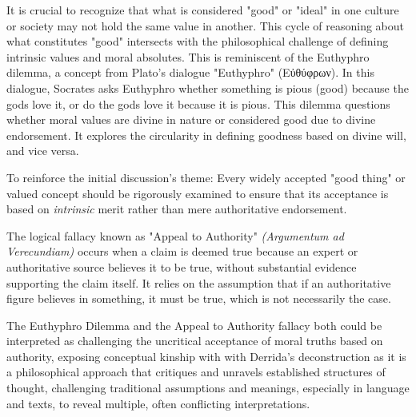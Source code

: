 \documentclass[11pt,a4]{article}
\newcommand{\textgreek}[1]{\begingroup\fontencoding{LGR}\selectfont#1\endgroup}
\begin{document}
    It is crucial to recognize that what is considered
    "good" or "ideal" in one culture or society may not
    hold the same value in another.
    This cycle of reasoning about what constitutes "good"
    intersects with the philosophical challenge of defining
    intrinsic values and moral absolutes. This is reminiscent
    of the Euthyphro dilemma, a concept from Plato's
    dialogue "Euthyphro" \textgreek{(Εὐθύφρων)}. In this
    dialogue, Socrates asks Euthyphro whether something is
    pious (good) because the gods love it, or do the
    gods love it because it is pious. This dilemma
    questions whether moral values are divine in nature or
    considered good due to divine endorsement. It explores
    the circularity in defining goodness based on divine
    will, and vice versa.


    To reinforce the initial discussion's theme:
    Every widely accepted "good thing" or valued concept
    should be rigorously examined
    to ensure that its acceptance is based on
    \textit{intrinsic} merit rather than
    mere authoritative endorsement.


    The  logical fallacy known as "Appeal to Authority" \textit{(Argumentum ad
    Verecundiam)} occurs when a claim is deemed true because an expert or
    authoritative source believes it to be true, without substantial
    evidence supporting the claim itself.  It relies on the assumption
    that if an authoritative figure believes in something,
    it must be true, which is not necessarily the case.



    The Euthyphro Dilemma and the Appeal to Authority fallacy
    both could be interpreted as challenging the uncritical
    acceptance of moral truths based on authority, exposing
    conceptual kinship with with Derrida's
    deconstruction\cite{Deconstruction} as it is a philosophical
    approach that critiques and unravels
    established structures of thought, challenging traditional
    assumptions and meanings, especially in language and texts,
    to reveal multiple, often conflicting interpretations.



\end{document}
